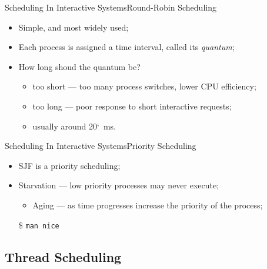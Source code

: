 \begin{frame}{Scheduling In Interactive Systems}{Round-Robin
    Scheduling}
  \begin{center}
  \end{center}
  \begin{itemize}
  \item Simple, and most widely used;
  \item Each process is assigned a time interval, called its \emph{quantum};
  \item How long shoud the quantum be?
    \begin{itemize}
    \item too short --- too many process switches, lower CPU efficiency;
    \item too long --- poor response to short interactive requests;
    \item usually around 20\char`~\unit[50]{ms}.
    \end{itemize}
  \end{itemize}
\end{frame}

\begin{frame}{Scheduling In Interactive Systems}{Priority Scheduling}
  \begin{center}
  \end{center}
  \begin{itemize}
  \item SJF is a priority scheduling;
  \item \alert{Starvation} --- low priority processes may never execute;
    \begin{itemize}
    \item \alert{Aging} --- as time progresses increase the priority of the process;
    \end{itemize}
  \item[\$] \texttt{man nice}
  \end{itemize}  
\end{frame}

\subsection{Thread Scheduling}
\label{sec:thread-scheduling}

